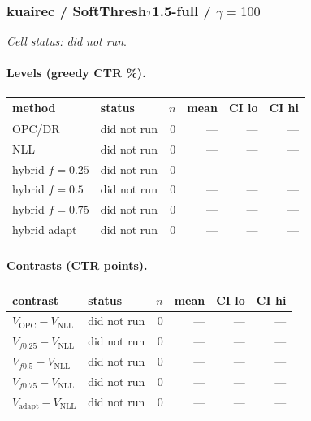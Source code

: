 \documentclass[10pt,a4paper]{article}
\begin{document}
\subsubsection{kuairec / SoftThresh$\tau$1.5-full / $\gamma=100$}
\emph{Cell status: did not run}.
\paragraph{Levels (greedy CTR \%).}
{\centering\small\begin{tabular}{llrrrr}
\toprule method & status & $n$ & mean & CI lo & CI hi \\
\midrule
OPC/DR & did not run & 0 & --- & --- & --- \\
NLL & did not run & 0 & --- & --- & --- \\
hybrid $f{=}0.25$ & did not run & 0 & --- & --- & --- \\
hybrid $f{=}0.5$ & did not run & 0 & --- & --- & --- \\
hybrid $f{=}0.75$ & did not run & 0 & --- & --- & --- \\
hybrid adapt & did not run & 0 & --- & --- & --- \\
\bottomrule\end{tabular}\par}
\paragraph{Contrasts (CTR points).}
{\centering\small\begin{tabular}{llrrrr}
\toprule contrast & status & $n$ & mean & CI lo & CI hi \\
\midrule
$V_{\mathrm{OPC}}-V_{\mathrm{NLL}}$ & did not run & 0 & --- & --- & --- \\
$V_{f0.25}-V_{\mathrm{NLL}}$ & did not run & 0 & --- & --- & --- \\
$V_{f0.5}-V_{\mathrm{NLL}}$ & did not run & 0 & --- & --- & --- \\
$V_{f0.75}-V_{\mathrm{NLL}}$ & did not run & 0 & --- & --- & --- \\
$V_{\mathrm{adapt}}-V_{\mathrm{NLL}}$ & did not run & 0 & --- & --- & --- \\
\bottomrule\end{tabular}\par}
\end{document}
